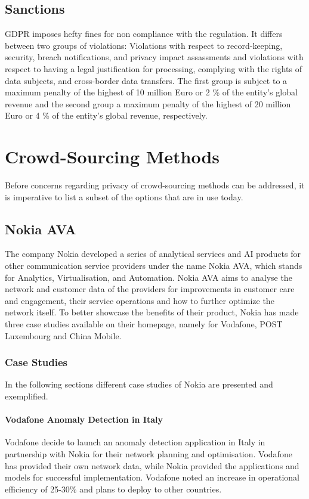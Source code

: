 \documentclass[a4paper,12pt]{report}
\begin{document}
	\closesection

	\section{Sanctions}
	\startsection
	GDPR imposes hefty fines for non compliance with the regulation.
	It differs between two groups of violations: Violations with respect to record-keeping, security, breach notifications, and privacy impact assassments and violations with respect to having a legal justification for processing, complying with the rights of data subjects, and cross-border data transfers.
	The first group is subject to a maximum penalty of the highest of 10 million Euro or 2 \% of the entity's global revenue and the second group a maximum penalty of the highest of 20 million Euro or 4 \% of the entity's global revenue, respectively.
	\closesection
	
	
	\chapter{Crowd-Sourcing Methods}
	Before concerns regarding privacy of crowd-sourcing methods can be addressed, it is imperative to list a subset of the options that are in use today.
	
	\section[Nokia AVA]{Nokia AVA \cite{NokiaAVACrowdAnalytics}}
	\startsection
		The company Nokia developed a series of analytical services and AI products for other communication service providers under the name Nokia AVA, which stands for Analytics, Virtualisation, and Automation. Nokia AVA aims to analyse the network and customer data of the providers for improvements in customer care and engagement, their service operations and how to further optimize the network itself.
		To better showcase the benefits of their product, Nokia has made three case studies available on their homepage, namely for Vodafone, POST Luxembourg and China Mobile.
		\subsection{Case Studies}
		\startsubsection
			In the following sections different case studies of Nokia are presented and exemplified.
			\subsubsection{Vodafone Anomaly Detection in Italy}
				Vodafone decide to launch an anomaly detection application in Italy in partnership with Nokia for their network planning and optimisation. Vodafone has provided their own network data, while Nokia provided the applications and models for successful implementation. Vodafone noted an increase in operational efficiency of 25-30\% and plans to deploy to other countries.	
\end{document}
